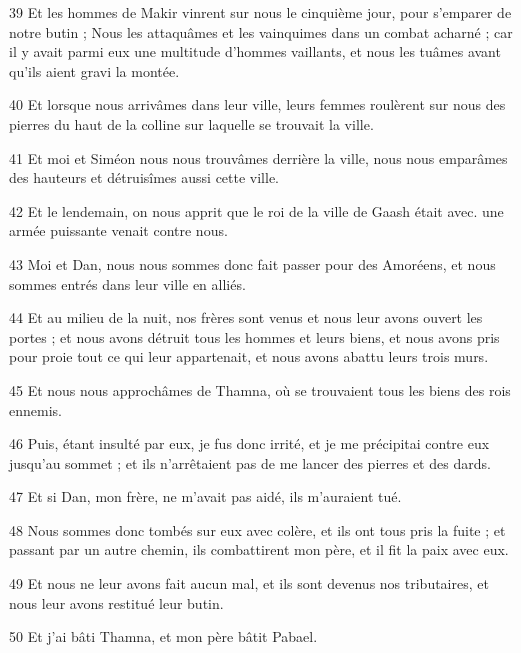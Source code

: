 \par 39 Et les hommes de Makir vinrent sur nous le cinquième jour, pour s'emparer de notre butin ; Nous les attaquâmes et les vainquimes dans un combat acharné ; car il y avait parmi eux une multitude d'hommes vaillants, et nous les tuâmes avant qu'ils aient gravi la montée.

\par 40 Et lorsque nous arrivâmes dans leur ville, leurs femmes roulèrent sur nous des pierres du haut de la colline sur laquelle se trouvait la ville.

\par 41 Et moi et Siméon nous nous trouvâmes derrière la ville, nous nous emparâmes des hauteurs et détruisîmes aussi cette ville.

\par 42 Et le lendemain, on nous apprit que le roi de la ville de Gaash était avec. une armée puissante venait contre nous.

\par 43 Moi et Dan, nous nous sommes donc fait passer pour des Amoréens, et nous sommes entrés dans leur ville en alliés.

\par 44 Et au milieu de la nuit, nos frères sont venus et nous leur avons ouvert les portes ; et nous avons détruit tous les hommes et leurs biens, et nous avons pris pour proie tout ce qui leur appartenait, et nous avons abattu leurs trois murs.

\par 45 Et nous nous approchâmes de Thamna, où se trouvaient tous les biens des rois ennemis.

\par 46 Puis, étant insulté par eux, je fus donc irrité, et je me précipitai contre eux jusqu'au sommet ; et ils n'arrêtaient pas de me lancer des pierres et des dards.

\par 47 Et si Dan, mon frère, ne m'avait pas aidé, ils m'auraient tué.

\par 48 Nous sommes donc tombés sur eux avec colère, et ils ont tous pris la fuite ; et passant par un autre chemin, ils combattirent mon père, et il fit la paix avec eux.

\par 49 Et nous ne leur avons fait aucun mal, et ils sont devenus nos tributaires, et nous leur avons restitué leur butin.

\par 50 Et j'ai bâti Thamna, et mon père bâtit Pabael.

